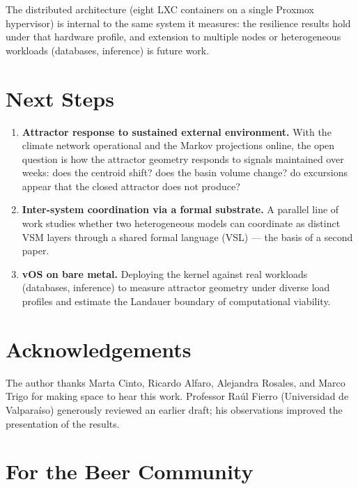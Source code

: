 \documentclass[11pt, a4paper]{article}
\newcommand{\vOS}{\textsf{vOS}}
\begin{document}
The distributed architecture (eight LXC containers on a single Proxmox hypervisor)
is internal to the same system it measures: the resilience results hold under that
hardware profile, and extension to multiple nodes or heterogeneous workloads
(databases, inference) is future work.

\section*{Next Steps}

\begin{enumerate}
  \item \textbf{Attractor response to sustained external environment.} With the
        climate network operational and the Markov projections online, the open
        question is how the attractor geometry responds to signals maintained over
        weeks: does the centroid shift? does the basin volume change? do excursions
        appear that the closed attractor does not produce?
  \item \textbf{Inter-system coordination via a formal substrate.} A parallel line
        of work studies whether two heterogeneous models can coordinate as distinct
        VSM layers through a shared formal language (VSL) --- the basis of a second
        paper.
  \item \textbf{\vOS{} on bare metal.} Deploying the kernel against real workloads
        (databases, inference) to measure attractor geometry under diverse load
        profiles and estimate the Landauer boundary of computational viability.
\end{enumerate}

\section*{Acknowledgements}

The author thanks Marta Cinto, Ricardo Alfaro, Alejandra Rosales, and Marco Trigo
for making space to hear this work. Professor Ra\'{u}l Fierro (Universidad de
Valpara\'{i}so) generously reviewed an earlier draft; his observations improved the
presentation of the results.

\section*{For the Beer Community}
\end{document}

